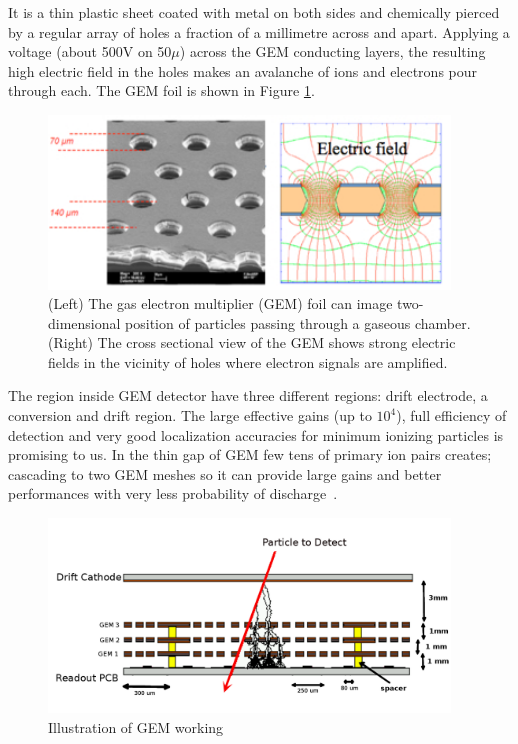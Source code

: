 It is a thin plastic sheet coated with metal on both sides and chemically pierced by a regular array of holes a fraction of a millimetre across and apart. 
Applying a voltage (about 500V on 50$\mu$) across the GEM conducting layers, the resulting high electric field in the holes makes an avalanche of ions and electrons pour through each. 
The GEM foil is shown in Figure \ref{fig:gem}.
\begin{figure}[!htbp]
	\centering
	\includegraphics[width=0.95\textwidth]{figures/GEM/KEKDTP3.jpg}
	\caption{(Left) The gas electron multiplier (GEM) foil can image two-dimensional position of particles passing through a gaseous chamber. (Right) The cross sectional view of the GEM shows strong electric fields in the vicinity of holes where electron signals are amplified.}
	\label{fig:gem}
\end{figure}
The region inside GEM detector have three different regions: drift electrode, a conversion and drift region.
The large effective gains (up to $10^4$), full efficiency of detection and very good localization accuracies for minimum ionizing particles is promising to us. 
In the thin gap of GEM few tens of primary ion pairs creates; cascading to two GEM meshes so it can provide large gains and better performances with very less probability of discharge~\cite{Bressan1999}.
\begin{figure}[!htbp]
	\begin{center}
		\includegraphics[width=0.95\textwidth]{figures/GEM/triple_gem.png}
		\caption{Illustration of GEM working}
		\label{fig:gemgaps}
	\end{center}
\end{figure} 
